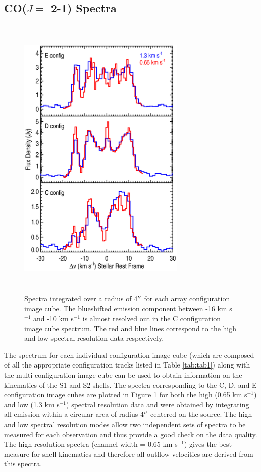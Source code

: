 \documentclass[iop]{emulateapj}
\begin{document}
\subsection{CO($J=$ 2-1) Spectra} \label{results1} %

\begin{figure}
\includegraphics[trim=90pt 60pt 45pt 50pt, clip, width=8.0cm, height=14.0cm]{f1.eps}
\caption{Spectra integrated over a radius of 4$\mbox{$^{\prime\prime}$}$ for each array configuration image cube. The blueshifted emission component between -16 km s${}^{-1}$ and -10 km s${}^{-1}$ is almost resolved out in the C configuration image cube spectrum. The red and blue lines correspond to the high and low spectral resolution data respectively.\label{fig1}}
\label{fig:fig1}
\end{figure}

The spectrum for each individual configuration image cube (which are composed of all the appropriate configuration tracks listed in Table \ref{tab:tab1}) along with the multi-configuration image cube can be used to obtain information on the kinematics of the S1 and S2 shells. The spectra corresponding  to the C, D, and E configuration image cubes are plotted in Figure \ref{fig:fig1} for both the high (0.65 km s${}^{-1}$) and low (1.3 km s${}^{-1}$) spectral resolution data and were obtained by integrating all emission within a circular area of radius 4$\mbox{$^{\prime\prime}$}$ centered on the source. The high and low spectral resolution modes allow two independent sets of spectra to be measured for each observation and thus provide a good check on the data quality. The high resolution  spectra (channel width = 0.65 km s${}^{-1}$)  gives the best measure for shell kinematics and therefore all outflow velocities are derived from this spectra.
\end{document}
